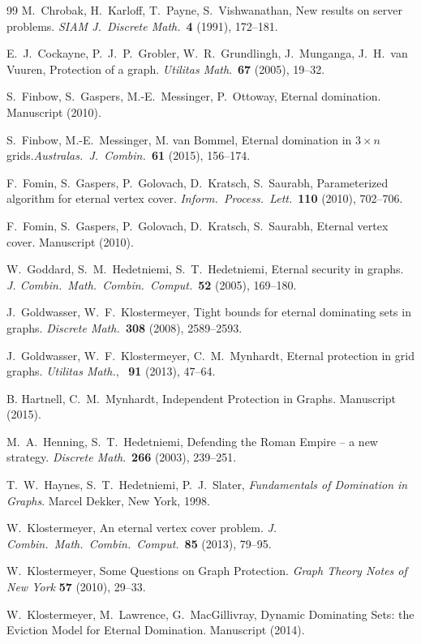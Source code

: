 \documentclass[12pt]{article}%
\begin{document}
\begin{thebibliography}{99}
M.~Chrobak, H.~Karloff, T.~Payne, S.~Vishwanathan, New results
on server problems. \emph{SIAM J.~Discrete Math.}~\textbf{{4}} (1991), 172--181.

E.~J.~Cockayne, P.~J.~P.~Grobler, W.~R.~Grundlingh,
J.~Munganga, J.~H.~van Vuuren, Protection of a graph. \emph{Utilitas
Math}.~\textbf{67 }(2005), 19--32.

S.~Finbow, S.~Gaspers, M.-E.~Messinger, P.~Ottoway, Eternal
domination. Manuscript (2010).

S.~Finbow, M.-E.~Messinger, M. van Bommel, Eternal domination in
$3 \times n$ grids.\emph{Australas.~J.~Combin.~}\textbf{61} (2015), 156--174.

F.~Fomin, S.~Gaspers, P.~Golovach, D.~Kratsch, S.~Saurabh,
Parameterized algorithm for eternal vertex cover.
\emph{Inform.~Process.~Lett.}~\textbf{110} (2010), 702--706.

F.~Fomin, S.~Gaspers, P.~Golovach, D.~Kratsch, S.~Saurabh,
Eternal vertex cover. Manuscript (2010).

W.~Goddard, S.~M.~Hedetniemi, S.~T.~Hedetniemi, Eternal security
in graphs. \emph{J. Combin.~Math.~Combin.~Comput.}~\textbf{52} (2005), 169--180.

J.~Goldwasser, W.~F.~Klostermeyer, Tight bounds for eternal
dominating sets in graphs. \emph{Discrete Math.~}\textbf{308} (2008), 2589--2593.

J.~Goldwasser, W.~F.~Klostermeyer, C.~M.~Mynhardt, Eternal
protection in grid graphs. \emph{Utilitas Math.}, ~\textbf{91} (2013), 47--64.

B. Hartnell, C.~M.~Mynhardt, Independent Protection in Graphs.
Manuscript (2015).

M.~A.~Henning, S.~T.~Hedetniemi, Defending the Roman Empire
-- a new strategy. \emph{Discrete Math}.~\textbf{266} (2003), 239--251.

T.~W.~Haynes, S.~T.~Hedetniemi, P.~J.~Slater, \emph{Fundamentals
of Domination in Graphs}. Marcel Dekker, New York, 1998.

W.~Klostermeyer, An eternal vertex cover problem. \emph{J.
Combin.~Math.~Combin.~Comput.}~\textbf{85} (2013), 79--95.

W.~Klostermeyer, Some Questions on Graph Protection.
\emph{Graph Theory Notes of New York} \textbf{57} (2010), 29--33.

W.~Klostermeyer, M.~Lawrence, G.~MacGillivray, Dynamic
Dominating Sets: the Eviction Model for Eternal Domination. Manuscript (2014).


\end{thebibliography}
\end{document}
